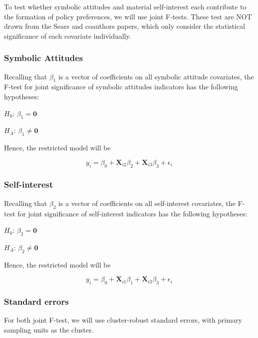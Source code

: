 \documentclass[]{article}
\begin{document}
To test whether symbolic attitudes and material self-interest each
contribute to the formation of policy preferences, we will use joint
F-tests. These test are NOT drawn from the Sears and coauthors papers,
which only consider the statistical significance of each covariate
individually.

\subsubsection{Symbolic Attitudes}\label{symbolic-attitudes}

Recalling that \(\beta_1\) is a vector of coefficients on all symbolic
attitude covariates, the F-test for joint significance of symbolic
attitudes indicators has the following hypotheses:

\(H_0\): \(\beta_1 = \textbf{0}\)

\(H_A\): \(\beta_1 \neq \textbf{0}\)

Hence, the restricted model will be

\begin{equation}
y_i = \beta_0 + \textbf{X}_{i2}\beta_2 +  \textbf{X}_{i3}\beta_3 + \epsilon_i
\end{equation}

\subsubsection{Self-interest}\label{self-interest}

Recalling that \(\beta_2\) is a vector of coefficients on all
self-interest covariates, the F-test for joint significance of
self-interest indicators has the following hypotheses:

\(H_0\): \(\beta_2 = \textbf{0}\)

\(H_A\): \(\beta_2 \neq \textbf{0}\)

Hence, the restricted model will be

\begin{equation}
y_i = \beta_0 + \textbf{X}_{i1}\beta_1 +  \textbf{X}_{i3}\beta_3 + \epsilon_i
\end{equation}

\subsubsection{Standard errors}\label{standard-errors}

For both joint F-test, we will use cluster-robust standard errors, with
primary sampling units as the cluster.
\end{document}
